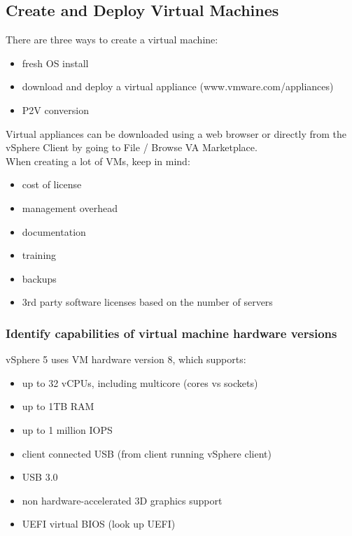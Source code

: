 \subsection{Create and Deploy Virtual Machines}

There are three ways to create a virtual machine:

\begin{itemize}
\item fresh OS install
\item download and deploy a virtual appliance (www.vmware.com/appliances)
\item P2V conversion
\end{itemize}

Virtual appliances can be downloaded using a web browser or directly from the
vSphere Client by going to File / Browse VA Marketplace.\\

When creating a lot of VMs, keep in mind:

\begin{itemize}
\item cost of license
\item management overhead
\item documentation
\item training
\item backups
\item 3rd party software licenses based on the number of servers
\end{itemize}

\subsubsection{Identify capabilities of virtual machine hardware versions}

vSphere 5 uses VM hardware version 8, which supports:

\begin{itemize}
\item up to 32 vCPUs, including multicore (cores vs sockets)
\item up to 1TB RAM
\item up to 1 million IOPS
\item client connected USB (from client running vSphere client)
\item USB 3.0
\item non hardware-accelerated 3D graphics support
\item UEFI virtual BIOS (look up UEFI)
\end{itemize}

